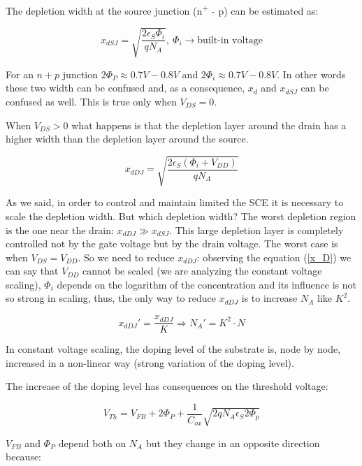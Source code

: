 \documentclass[a4paper, 12pt, twoside, openright]{report}
\newcommand{\super}{\textsuperscript}
\begin{document}
{The depletion width at the source junction (n\super{+} - p) can be estimated as:

	\begin{equation}
	x_{dSJ} = \sqrt{\frac{2 \epsilon_S \Phi_i}{q N_A}},\ \Phi_i \rightarrow \text{built-in voltage}
	\label{}
	\end{equation}

For an $n+p$ junction $2 \Phi_P \approx 0.7 V - 0.8 V$ and $2 \Phi_i \approx 0.7 V - 0.8 V$. In other words these two width can be confused and, as a consequence, $x_{d}$ and $x_{dSJ}$ can be confused as well. This is true only when $V_{DS} = 0$.

When $V_{DS} > 0$ what happens is that the depletion layer around the drain has a higher width than the depletion layer around the source.

	\begin{equation}
	x_{dDJ} = \sqrt{\frac{2 \epsilon_S (\Phi_i + V_{DD})}{q N_A}}
	\label{x_D}
	\end{equation}

As we said, in order to control and maintain limited the SCE it is necessary to scale the depletion width. But which depletion width? The worst depletion region is the one near the drain: $x_{dDJ} \gg x_{dSJ}$. This large depletion layer is completely controlled not by the gate voltage but by the drain voltage. The worst case is when  $V_{DS} = V_{DD}$. So we need to reduce $x_{dDJ}$: observing the equation (\ref{x_D}) we can say that $V_{DD}$ cannot be scaled (we are analyzing the constant voltage scaling), $\Phi_i$ depends on the logarithm of the concentration and its influence is not so strong in scaling, thus, the only way to reduce $x_{dDJ}$ is to increase $N_{A}$ like $K^{2}$.

	\begin{equation}
	x_{dDJ}' = \frac{x_{dDJ}}{K} \Rightarrow N_A' = K^2 \cdot N
	\label{x_D}
	\end{equation}

In constant voltage scaling, the doping level of the substrate is, node by node, increased in a non-linear way (strong variation of the doping level).

The increase of the doping level has consequences on the threshold voltage:

	\begin{equation}
	V_{Th} = V_{FB}+2\Phi_P+\frac{1}{C_{ox}}\sqrt{2qN_A\epsilon_S 2\Phi_p}
	\end{equation}

$V_{FB}$ and $\Phi_P$ depend both on $N_{A}$ but they change in an opposite direction because: 

}
\end{document}
